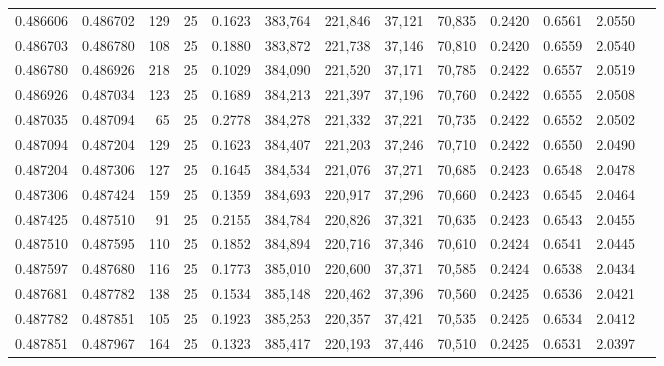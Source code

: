 \begin{tabular}{rrrrrrrrrrrrr}
0.486606 & 0.486702 &   129 &  25 &                                     0.1623 & 383,764 & 221,846 &  37,121 &  70,835 & 0.2420 & 0.6561 & 2.0550 \\
0.486703 & 0.486780 &   108 &  25 &                                     0.1880 & 383,872 & 221,738 &  37,146 &  70,810 & 0.2420 & 0.6559 & 2.0540 \\
0.486780 & 0.486926 &   218 &  25 &                                     0.1029 & 384,090 & 221,520 &  37,171 &  70,785 & 0.2422 & 0.6557 & 2.0519 \\
0.486926 & 0.487034 &   123 &  25 &                                     0.1689 & 384,213 & 221,397 &  37,196 &  70,760 & 0.2422 & 0.6555 & 2.0508 \\
0.487035 & 0.487094 &    65 &  25 &                                     0.2778 & 384,278 & 221,332 &  37,221 &  70,735 & 0.2422 & 0.6552 & 2.0502 \\
0.487094 & 0.487204 &   129 &  25 &                                     0.1623 & 384,407 & 221,203 &  37,246 &  70,710 & 0.2422 & 0.6550 & 2.0490 \\
0.487204 & 0.487306 &   127 &  25 &                                     0.1645 & 384,534 & 221,076 &  37,271 &  70,685 & 0.2423 & 0.6548 & 2.0478 \\
0.487306 & 0.487424 &   159 &  25 &                                     0.1359 & 384,693 & 220,917 &  37,296 &  70,660 & 0.2423 & 0.6545 & 2.0464 \\
0.487425 & 0.487510 &    91 &  25 &                                     0.2155 & 384,784 & 220,826 &  37,321 &  70,635 & 0.2423 & 0.6543 & 2.0455 \\
0.487510 & 0.487595 &   110 &  25 &                                     0.1852 & 384,894 & 220,716 &  37,346 &  70,610 & 0.2424 & 0.6541 & 2.0445 \\
0.487597 & 0.487680 &   116 &  25 &                                     0.1773 & 385,010 & 220,600 &  37,371 &  70,585 & 0.2424 & 0.6538 & 2.0434 \\
0.487681 & 0.487782 &   138 &  25 &                                     0.1534 & 385,148 & 220,462 &  37,396 &  70,560 & 0.2425 & 0.6536 & 2.0421 \\
0.487782 & 0.487851 &   105 &  25 &                                     0.1923 & 385,253 & 220,357 &  37,421 &  70,535 & 0.2425 & 0.6534 & 2.0412 \\
0.487851 & 0.487967 &   164 &  25 &                                     0.1323 & 385,417 & 220,193 &  37,446 &  70,510 & 0.2425 & 0.6531 & 2.0397 \\

\end{tabular}
